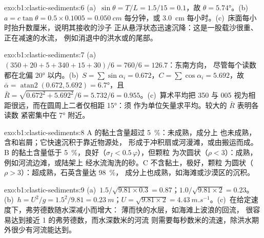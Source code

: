 \begin{solution}{exo:b1:clastic-sediments:6}
(a)~$\sin\theta = T/L = 1.5/15 = 0.1$，故 $\theta = \ang{5.74}$。(b)~$a =
c\tan\theta = 0.5 \times 0.1005 = \qty{0.050}{cm}$ 每分钟，或
\qty{3.0}{cm} 每小时。(c)~床面每小时抬升数厘米，说明其接收的沙子
正从悬浮状态迅速沉降：这是一股载沙很重、正在减速的水流，
例如消退中的洪水或的尾部。
\end{solution}

\begin{solution}{exo:b1:clastic-sediments:7}
(a)~$(350 + 20 + 5 + 340 + 15 + 30)/6 = 760/6 = 126.7$：东南方向，
尽管每个读数都在北偏 \ang{20} 以内。(b)~$S =
\sum\sin\alpha_i = 0.672$，$C = \sum\cos\alpha_i = 5.692$，故 $\bar\alpha =
\operatorname{atan2}(0.672, 5.692) = \ang{6.7}$，且 $\bar R =
\sqrt{0.672^2 + 5.692^2}/6 = 5.732/6 = 0.955$。(c)~算术平均把
350 与 005 视为相距很远，而在圆周上二者仅相距 \ang{15}：须
作为单位矢量求平均。较大的 $\bar R$ 表明各读数
紧密集中在 \ang{7} 附近。
\end{solution}

\begin{solution}{exo:b1:clastic-sediments:8}
A 的黏土含量超过 \qty{5}{\percent}：未成熟，成分上
也未成熟，含和岩屑；它快速沉积于靠近物源处，
形成于冲积扇或河漫滩，或由搬运而成。B 的黏土含量低于
\qty{5}{\percent}，良好（$\sigma_I < 0.5\,\varphi$），但颗粒
为次圆状（$\rho < 3$）：成熟，例如河流边滩，或陆架上
经水流淘洗的砂。C 不含黏土，极好，颗粒
为圆状（$\rho > 3$）：超成熟，石英含量达 \qty{98}{\percent}，
成分上也成熟，如海滩或沙漠区的沉积。
\end{solution}

\begin{solution}{exo:b1:clastic-sediments:9}
(a)~$1.5/\sqrt{9.81 \times 0.3} = 0.87$；$1.0/\sqrt{9.81 \times 2} = 0.23$。
(b)~$h = U^2/g = 1.5^2/9.81 = \qty{0.23}{m}$；$U = \sqrt{9.81 \times 2} =
\qty{4.43}{m.s^{-1}}$。(c)~在给定速度下，弗劳德数随水深减小而增大：
薄而快的水层，如海滩上波浪的回流，
很容易达到接近 1 的弗劳德数，而水深数米的河流
则需要每秒数米的流速，除洪水期外很少有河流能达到。
\end{solution}

